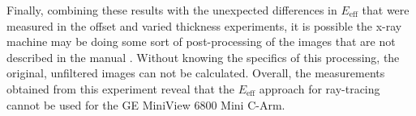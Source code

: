 \par Finally, combining these results with the unexpected differences in $E_{\text{eff}}$ that were measured in the offset and varied thickness experiments, it is possible the x-ray machine may be doing some sort of post-processing of the images that are not described in the manual \cite{CArm}. Without knowing the specifics of this processing, the original, unfiltered images can not be calculated. Overall, the measurements obtained from this experiment reveal that the $E_{\text{eff}}$ approach for ray-tracing cannot be used for the GE MiniView 6800 Mini C-Arm. 






